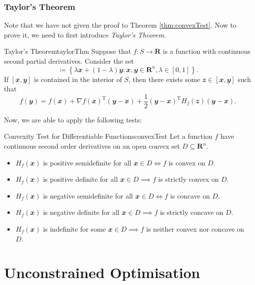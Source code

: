 \documentclass[math, code]{amznotes}
\theoremstyle{remark}
\begin{document}
\subsection{Taylor's Theorem}
Note that we have not given the proof to Theorem \ref{thm:convexTest}. Now to prove it, we need to first introduce \textit{Taylor's Theorem}.
\begin{thmbox}{Taylor's Theorem}{taylorThm}
    Suppose that $f \colon S \to \mathbf{R}$ is a function with continuous second partial derivatives. Consider the set
    \begin{displaymath}
        [\mathbfit{x}, \mathbfit{y}] \coloneqq \left\{\lambda\mathbfit{x} + (1 - \lambda)\mathbfit{y} \colon \mathbfit{x}, \mathbfit{y} \in \mathbf{R}^n, \lambda \in [0, 1]\right\}.
    \end{displaymath}
    If $[\mathbfit{x}, \mathbfit{y}]$ is contained in the interior of $S$, then there exists some $\mathbfit{z} \in [\mathbfit{x}, \mathbfit{y}]$ such that
    \begin{equation*}
        f(\mathbfit{y}) = f(\mathbfit{x}) + \nabla f(\mathbfit{x})^{\mathrm{T}}(\mathbfit{y - x}) + \frac{1}{2}(\mathbfit{y - x})^{\mathrm{T}}H_f(\mathbfit{z})(\mathbfit{y - x}).
    \end{equation*}
\end{thmbox}
Now, we are able to apply the following tests:
\begin{thmbox}{Convexity Test for Differentiable Functions}{convexTest}
    Let a function $f$ have continuous second order derivatives on an open convex set $D \subseteq \mathbf{R}^n$.
    \begin{itemize}
        \item $H_f(\mathbfit{x})$ is positive semidefinite for all $\mathbfit{x} \in D \iff f$ is convex on $D$.
        \item $H_f(\mathbfit{x})$ is positive definite for all $\mathbfit{x} \in D \implies f$ is strictly convex on $D$.
        \item $H_f(\mathbfit{x})$ is negative semidefinite for all $\mathbfit{x} \in D \iff f$ is concave on $D$.
        \item $H_f(\mathbfit{x})$ is negative definite for all $\mathbfit{x} \in D \implies f$ is strictly concave on $D$.
        \item $H_f(\mathbfit{x})$ is indefinite for some $\mathbfit{x} \in D \implies f$ is neither convex nor concave on $D$.
    \end{itemize}
\end{thmbox}
\chapter{Unconstrained Optimisation}
\end{document}

